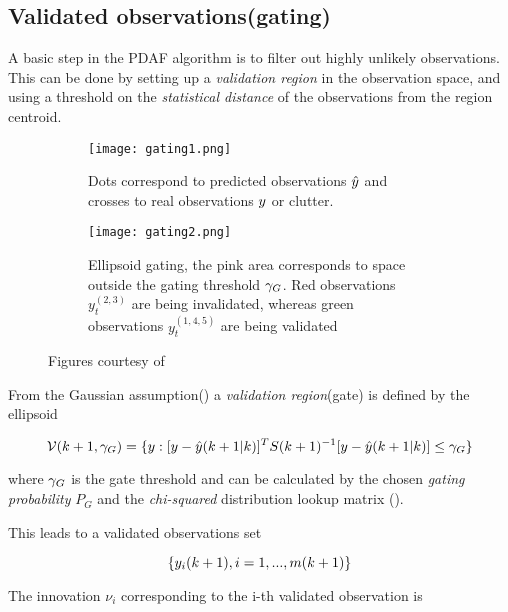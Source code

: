 \subsection{Validated observations(gating)}

A basic step in the PDAF algorithm is to filter out highly unlikely observations. This can be done by setting up a \emph{validation region} in the observation space, and using a threshold on the \emph{statistical distance} of the observations from the region centroid.


\begin{figure}[H]
	\begin{subfigure}{.5\textwidth}
		\centering
		\texttt{[image: gating1.png]}
		\caption{Dots correspond to predicted observations ${\hat{{y}}}$ and  crosses to real observations ${y}$ or clutter.}
		\label{fig:gating1}
	\end{subfigure}
	\begin{subfigure}{.5\textwidth}
			\centering
			\texttt{[image: gating2.png]}
			\caption{Ellipsoid gating, the pink area corresponds to space outside the gating threshold ${\gamma_G}$. Red observations $y_t^{(2,3)}$ are being invalidated, whereas green observations $y_t^{(1,4,5)}$ are being validated}
			\label{fig:gating2}
	\end{subfigure}
	\caption{Figures courtesy of \cite{TargetTracking}}
	\label{fig:fig}
\end{figure}




From the Gaussian assumption() a \emph{validation region}(gate) is defined by the ellipsoid

\begin{equation}\label{eq:validationGate}
\mathcal{V}(k+1, {\gamma_G}) = \{{y}: [{y}-{\hat{{y}}}(k+1|k)]^T S(k+1)^{-1} [{y}-{\hat{{y}}}(k+1|k)] \leq {\gamma_G} \}
\end{equation}



where ${\gamma_G}$ is the gate threshold and can be calculated by the chosen \emph{gating probability }$P_G$ and the \emph{chi-squared} distribution lookup matrix ().


This leads to a validated observations set

$$
\{{y}_i(k+1), i = 1, ..., m(k+1)\}
$$


The innovation $\nu_i$ corresponding to the i-th validated observation is

